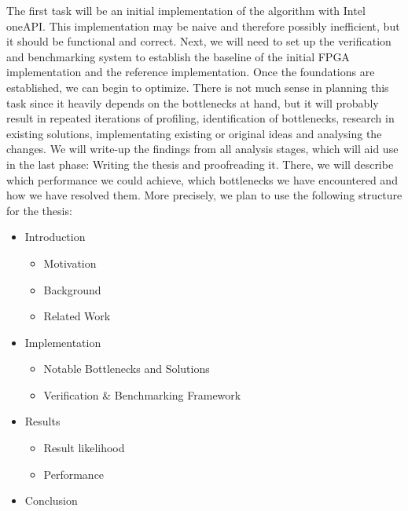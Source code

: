 The first task will be an initial implementation of the algorithm with Intel oneAPI. This implementation may be naive and therefore possibly inefficient, but it should be functional and correct. Next, we will need to set up the verification and benchmarking system to establish the baseline of the initial FPGA implementation and the reference implementation. Once the foundations are established, we can begin to optimize. There is not much sense in planning this task since it heavily depends on the bottlenecks at hand, but it will probably result in repeated iterations of profiling, identification of bottlenecks, research in existing solutions, implementating existing or original ideas and analysing the changes. We will write-up the findings from all analysis stages, which will aid use in the last phase: Writing the thesis and proofreading it. There, we will describe which performance we could achieve, which bottlenecks we have encountered and how we have resolved them. More precisely, we plan to use the following structure for the thesis:

\begin{itemize}
    \item Introduction
    \begin{itemize}
        \item Motivation
        \item Background
        \item Related Work
    \end{itemize}
    \item Implementation
    \begin{itemize}
        \item Notable Bottlenecks and Solutions
        \item Verification \& Benchmarking Framework
    \end{itemize}
    \item Results
    \begin{itemize}
        \item Result likelihood
        \item Performance
    \end{itemize}
    \item Conclusion
\end{itemize}

